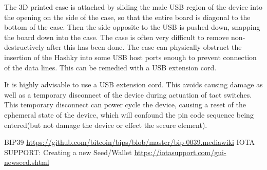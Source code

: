 \documentclass{article}
\begin{document}
The 3D printed case is attached by sliding the male USB region of the device into the opening on the side of the case, so that the entire board is diagonal to the bottom of the case. Then the side opposite to the USB is pushed down, snapping the board down into the case. The case is often very difficult to remove non-destructively after this has been done. The case can physically obstruct the insertion of the Hashky into some USB host ports enough to prevent connection of the data lines. This can be remedied with a USB extension cord. 

It is highly advisable to use a USB extension cord. This avoids causing damage as well as a temporary disconnect of the device during actuation of tact switches. This temporary disconnect can power cycle the device, causing a reset of the ephemeral state of the device, which will confound the pin code sequence being entered(but not damage the device or effect the secure element). 


\begin{thebibliography}{99}
 BIP39 \href{https://github.com/bitcoin/bips/blob/master/bip-0039.mediawiki}{https://github.com/bitcoin/bips/blob/master/bip-0039.mediawiki}
 IOTA SUPPORT: Creating a new Seed/Wallet  \href{https://iotasupport.com/gui-newseed.shtml}{https://iotasupport.com/gui-newseed.shtml}
\end{thebibliography}
\end{document}
